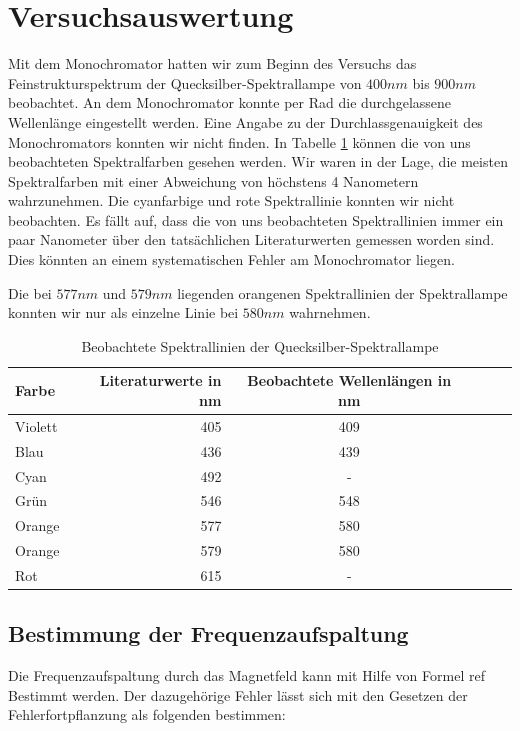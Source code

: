 \documentclass[10pt,a4paper]{article}
\begin{document}
\section{Versuchsauswertung}

Mit dem Monochromator hatten wir zum Beginn des Versuchs das Feinstrukturspektrum der Quecksilber-Spektrallampe von $400nm$
bis $900nm$ beobachtet. An dem Monochromator konnte per Rad die durchgelassene Wellenlänge eingestellt werden. Eine Angabe zu der Durchlassgenauigkeit des Monochromators konnten wir nicht finden. In Tabelle \ref{spektrum} können die von uns beobachteten Spektralfarben gesehen werden. Wir waren in der Lage, die meisten Spektralfarben mit einer Abweichung von höchstens 4 Nanometern wahrzunehmen. Die cyanfarbige und rote Spektrallinie konnten wir nicht beobachten. Es fällt auf, dass die von uns beobachteten Spektrallinien immer ein paar Nanometer über den tatsächlichen Literaturwerten gemessen worden sind. Dies könnten an einem systematischen Fehler am Monochromator liegen.

Die bei $577nm$ und $579nm$ liegenden orangenen Spektrallinien der Spektrallampe konnten wir nur als einzelne Linie bei $580nm$ wahrnehmen.

\begin{table}[h!]
	\centering
\begin{tabular}{|l|r|c|lrp{16cm}}\hline
	Farbe & Literaturwerte in nm & Beobachtete Wellenlängen in nm\\\hline
	Violett & 405 & 409\\
	Blau & 436 & 439\\
	Cyan & 492 & -\\
	Grün & 546 & 548\\
	Orange & 577 & 580\\
	Orange & 579 & 580\\
	Rot & 615 & -\\\hline
\end{tabular}
	\caption{Beobachtete Spektrallinien der Quecksilber-Spektrallampe}
	\label{spektrum}
\end{table}


\subsection{Bestimmung der Frequenzaufspaltung}

Die Frequenzaufspaltung durch das Magnetfeld kann mit Hilfe von Formel ref Bestimmt werden. Der dazugehörige Fehler lässt sich mit den Gesetzen der Fehlerfortpflanzung als folgenden bestimmen:
\end{document}
